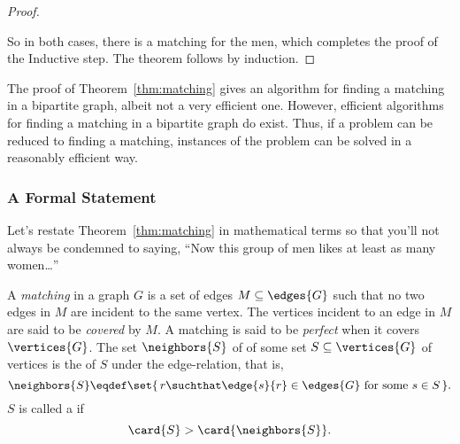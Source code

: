 \begin{proof}
\begin{description}
\iffalse
We can also match the rest of the men by induction if we show that
  the matching condition holds for the remaining men and women.  To
  check the matching condition for the remaining people, consider an
  arbitrary subset of the remaining men $X' \subseteq (M - X)$, and
  let $Y'$ be the set of remaining women that they like.  We must show
  that $\card{X'} \leq \card{Y'}$.  Originally, the combined set of
  men $X \cup X'$ liked the set of women $Y \cup Y'$.  So, by the
  matching condition, we know:
%
  \begin{equation*}
  \card{X \cup X'}  \leq  \card{Y \cup Y'}
  \end{equation*}
%
  We sent away $\card{X}$ men from the set on the left (leaving $X'$)
  and sent away an equal number of women from the set on the right
  (leaving $Y'$).  Therefore, it must be that $\card{X'} \leq
  \card{Y'}$ as claimed.
\fi

\end{description}

So in both cases, there is a matching for the men, which completes the
proof of the Inductive step.  The theorem follows by induction.
\end{proof}

The proof of Theorem~\ref{thm:matching} gives an algorithm for finding
a matching in a bipartite graph, albeit not a very efficient one.
However, efficient algorithms for finding a matching in a bipartite
graph do exist.  Thus, if a problem can be reduced to finding a
matching, instances of the problem can be solved in a reasonably
efficient way.

\subsubsection{A Formal Statement}

Let's restate Theorem~\ref{thm:matching} in mathematical terms so that
you'll not always be condemned to saying, ``Now this group of men
likes at least as many women\dots''

\begin{definition}\label{def:5K}
A \emph{matching}  in a graph $G$ is a set of
edges $M \subseteq \edges{G}$ such that no two edges in $M$ are
incident to the same vertex.  The vertices incident to an edge in $M$
are said to be \emph{covered} 
 by $M$.  A matching is said to be
\emph{perfect}  when it
covers $\vertices{G}$.  The set $\neighbors{S}$ of  of
some set $S \subseteq \vertices{G}$ of vertices is the  of
$S$ under the edge-relation, \iffalse set of all vertices adjacent to
some vertex in $S$.  \fi that is,
\[
\neighbors{S} \eqdef \set{\,r \suchthat \edge{s}{r} \in \edges{G} \text{ for
    some } s \in S\,}.
\]
$S$ is called a  if
\[
\card{S} > \card{\neighbors{S}}.
\]
\end{definition}

